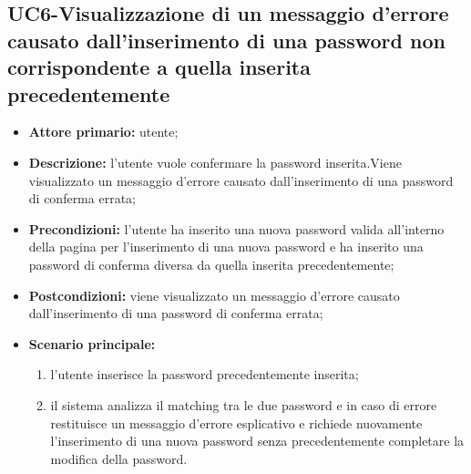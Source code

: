 \subsection{UC6-Visualizzazione di un messaggio d'errore causato dall'inserimento di una password non corrispondente a quella inserita precedentemente}
\begin{itemize}
    \item \textbf{Attore primario:} utente;

    \item\textbf{Descrizione:} l'utente vuole confermare la password inserita.Viene visualizzato un messaggio d'errore causato dall'inserimento di una password di conferma errata;

    \item\textbf{Precondizioni:} l'utente ha inserito una nuova password valida all'interno della pagina per l'inserimento di una nuova password e ha inserito una password di conferma diversa da quella inserita precedentemente;

    \item\textbf{Postcondizioni:} viene visualizzato un messaggio d'errore causato dall'inserimento di una password di conferma errata;

    \item \textbf{Scenario principale:}
    \begin{enumerate}
          \item l'utente inserisce la password precedentemente inserita;
          \item il sistema analizza il matching tra le due password e in caso di errore restituisce un messaggio d'errore esplicativo e richiede nuovamente l'inserimento di una nuova password senza precedentemente completare la modifica della password.
    \end{enumerate}
\end{itemize}
